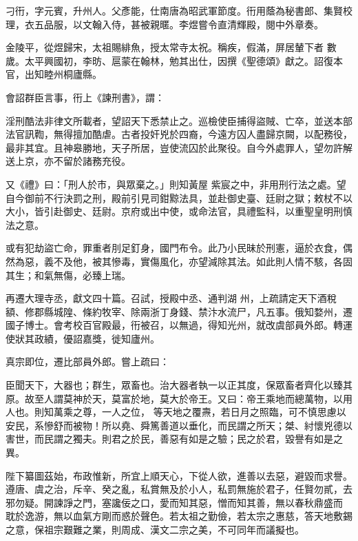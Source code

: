 \begin{pinyinscope}
 刁衎，字元賓，升州人。父彥能，仕南唐為昭武軍節度。衎用蔭為秘書郎、集賢校理，衣五品服，以文翰入侍，甚被親暱。李煜嘗令直清輝殿，閱中外章奏。



 金陵平，從煜歸宋，太祖賜緋魚，授太常寺太祝。稱疾，假滿，屏居輦下者
 數歲。太平興國初，李昉、扈蒙在翰林，勉其出仕，因撰《聖德頌》獻之。詔復本官，出知睦州桐廬縣。



 會詔群臣言事，衎上《諫刑書》，謂：



 淫刑酷法非律文所載者，望詔天下悉禁止之。巡檢使臣捕得盜賊、亡卒，並送本部法官訊鞫，無得擅加酷虐。古者投奸兇於四裔，今遠方囚人盡歸京闕，以配務役，最非其宜。且神皋勝地，天子所居，豈使流囚於此聚役。自今外處罪人，望勿許解送上京，亦不留於諸務充役。



 又《禮》曰：「刑人於市，與眾棄之。」則知黃屋
 紫宸之中，非用刑行法之處。望自今御前不行決罰之刑，殿前引見司鉗黥法具，並赴御史臺、廷尉之獄；敕杖不以大小，皆引赴御史、廷尉。京府或出中使，或命法官，具禮監科，以重聖皇明刑慎法之意。



 或有犯劫盜亡命，罪重者刖足釘身，國門布令。此乃小民昧於刑憲，逼於衣食，偶然為惡，義不及他，被其慘毒，實傷風化，亦望減除其法。如此則人情不駭，各固其生；和氣無傷，必臻上瑞。



 再遷大理寺丞，獻文四十篇。召試，授殿中丞、通判湖
 州，上疏請定天下酒稅額、修郡縣城隍、條約牧宰、除兩浙丁身錢、禁汴水流尸，凡五事。俄知婺州，遷國子博士。會考校百官殿最，衎被召，以無過，得知光州，就改虞部員外郎。轉運使狀其政績，優詔嘉獎，徙知廬州。



 真宗即位，遷比部員外郎。嘗上疏曰：



 臣聞天下，大器也；群生，眾畜也。治大器者執一以正其度，保眾畜者齊化以臻其原。故至人謂莫神於天，莫富於地，莫大於帝王。又曰：帝王乘地而總萬物，以用人也。則知萬乘之尊，一人之位，
 等天地之覆燾，若日月之照臨，可不慎思慮以安民，系慘舒而被物！所以堯、舜篤善道以垂化，而民謂之所天；桀、紂懷兇德以害世，而民謂之獨夫。則君之於民，善惡有如是之驗；民之於君，毀譽有如是之異。



 陛下纂圖茲始，布政惟新，所宜上順天心，下從人欲，進善以去惡，避毀而求譽。遵唐、虞之治，斥辛、癸之亂，私賞無及於小人，私罰無施於君子，任賢勿貳，去邪勿疑。開諫諍之門，塞讒佞之口，愛而知其惡，憎而知其善，無以春秋鼎盛而
 耽於逸游，無以血氣方剛而惑於聲色。若太祖之勤儉，若太宗之惠慈，答天地敷錫之意，保祖宗艱難之業，則周成、漢文二宗之美，不可同年而議擬也。




\end{pinyinscope}
